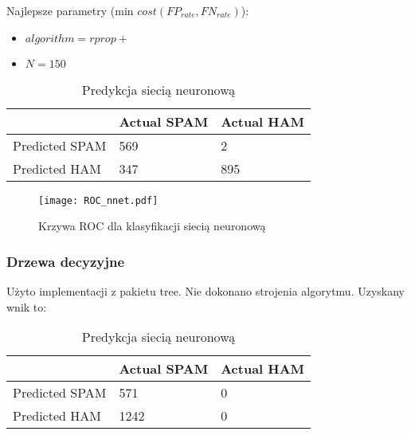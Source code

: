 \documentclass[fleqn]{article}
\begin{document}
Najlepsze parametry (min $cost(FP_{rate}, FN_{rate})$):
\begin{itemize}
    \item $algorithm = rprop+$
    \item $N  = 150$
\end{itemize}

\begin{table}[h!]
  \centering
  \label{tab:table1}
  \begin{tabular}{l||l|l}
     & Actual SPAM & Actual HAM\\
    \hline
    Predicted SPAM & 569 & 2\\
    Predicted HAM & 347 & 895\\
  \end{tabular}
  \caption{Predykcja siecią neuronową }
\end{table}

\begin{figure}[H]
\centering
\texttt{[image: ROC\_nnet.pdf]}
\caption{Krzywa ROC dla klasyfikacji siecią neuronową \label{overflow}}
\label{fig:picture}
\end{figure}



\subsubsection{Drzewa decyzyjne}
Użyto implementacji z pakietu tree.
Nie dokonano strojenia algorytmu.
Uzyskany wnik to:

\begin{table}[h!]
  \centering
  \label{tab:table1}
  \begin{tabular}{l||l|l}
     & Actual SPAM & Actual HAM\\
    \hline
    Predicted SPAM & 571 & 0\\
    Predicted HAM & 1242 & 0\\
  \end{tabular}
  \caption{Predykcja siecią neuronową }
\end{table}
\end{document}
